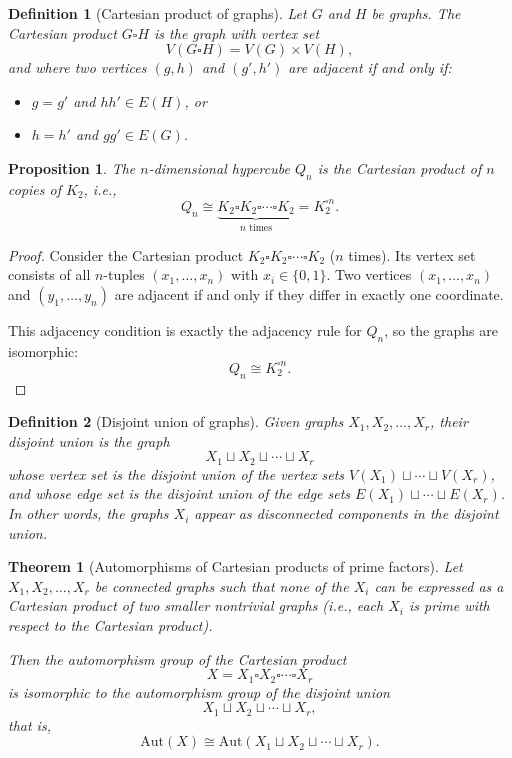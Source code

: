 \documentclass[12pt,a4paper,openany]{book}
\newtheorem{theorem}{Theorem}[section]
\newtheorem{definition}{Definition}[section]
\newtheorem{proposition}{Proposition}[section]
\begin{document}
\begin{definition}[Cartesian product of graphs]
Let \(G\) and \(H\) be graphs.  
The \emph{Cartesian product} \(G \square H\) is the graph with vertex set
\[
V(G \square H) = V(G) \times V(H),
\]
and where two vertices \((g,h)\) and \((g',h')\) are adjacent if and only if:
\begin{itemize}
  \item \(g = g'\) and \(hh' \in E(H)\), or
  \item \(h = h'\) and \(gg' \in E(G)\).
\end{itemize}
\end{definition}


\begin{proposition}
The $n$-dimensional hypercube $Q_n$ is the Cartesian product of $n$ copies of $K_2$, i.e.,
\[
Q_n \cong \underbrace{K_2 \square K_2 \square \cdots \square K_2}_{n \text{ times}} = K_2^{\square n}.
\]
\end{proposition}

\begin{proof}
Consider the Cartesian product $K_2 \square K_2 \square \cdots \square K_2$ ($n$ times). Its vertex set consists of all $n$-tuples $(x_1,\dots,x_n)$ with $x_i \in \{0,1\}$. Two vertices $(x_1,\dots,x_n)$ and $(y_1,\dots,y_n)$ are adjacent if and only if they differ in exactly one coordinate.

This adjacency condition is exactly the adjacency rule for $Q_n$, so the graphs are isomorphic:
\[
Q_n \cong K_2^{\square n}.
\]
\end{proof}



\begin{definition}[Disjoint union of graphs]
Given graphs \(X_1, X_2, \dots, X_r\), their \emph{disjoint union} is the graph
\[
X_1 \sqcup X_2 \sqcup \cdots \sqcup X_r
\]
whose vertex set is the disjoint union of the vertex sets \(V(X_1) \sqcup \cdots \sqcup V(X_r)\), and whose edge set is the disjoint union of the edge sets \(E(X_1) \sqcup \cdots \sqcup E(X_r)\).  
In other words, the graphs \(X_i\) appear as disconnected components in the disjoint union.
\end{definition}

\begin{theorem}[Automorphisms of Cartesian products of prime factors]
Let \(X_1, X_2, \dots, X_r\) be connected graphs such that none of the \(X_i\) can be expressed as a Cartesian product of two smaller nontrivial graphs (i.e., each \(X_i\) is \emph{prime} with respect to the Cartesian product).

Then the automorphism group of the Cartesian product
\[
X = X_1 \square X_2 \square \cdots \square X_r
\]
is isomorphic to the automorphism group of the disjoint union
\[
X_1 \sqcup X_2 \sqcup \cdots \sqcup X_r,
\]
that is,
\[
\mathrm{Aut}(X) \cong \mathrm{Aut}(X_1 \sqcup X_2 \sqcup \cdots \sqcup X_r).
\]
\end{theorem}
\end{document}

